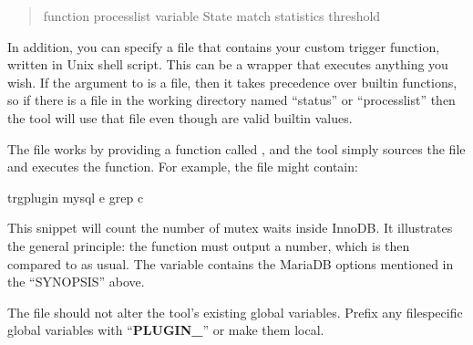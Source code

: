 \documentclass[letterpaper,10pt,english]{sphinxmanual}
\begin{document}
\begin{fulllineitems}
\begin{quote}
\begin{sphinxVerbatim}[commandchars=\\\{\}]
\PYGZhy{}\PYGZhy{}function processlist 
\PYGZhy{}\PYGZhy{}variable State       
\PYGZhy{}\PYGZhy{}match statistics     
\PYGZhy{}\PYGZhy{}threshold 
\end{sphinxVerbatim}
\end{quote}

\sphinxAtStartPar
In addition, you can specify a file that contains your custom trigger
function, written in Unix shell script.  This can be a wrapper that executes
anything you wish.  If the argument to {\hyperref[\detokenize{mariadb-stat:cmdoption-mariadb-stat-function}]{}} is a file, then it
takes precedence over built\sphinxhyphen{}in functions, so if there is a file in the working
directory named “status” or “processlist” then the tool will use that file
even though are valid built\sphinxhyphen{}in values.

\sphinxAtStartPar
The file works by providing a function called , and the tool
simply sources the file and executes the function.  For example, the file
might contain:

\begin{sphinxVerbatim}[commandchars=\\\{\}]
trg\PYGZus{}plugin 
   mysql  \PYGZhy{}e  
      grep \PYGZhy{}c 
\end{sphinxVerbatim}

\sphinxAtStartPar
This snippet will count the number of mutex waits inside InnoDB.  It
illustrates the general principle: the function must output a number, which is
then compared to {\hyperref[\detokenize{mariadb-stat:cmdoption-mariadb-stat-threshold}]{}} as usual.  The  variable
contains the MariaDB options mentioned in the “SYNOPSIS” above.

\sphinxAtStartPar
The file should not alter the tool’s existing global variables.  Prefix any
file\sphinxhyphen{}specific global variables with “{\color{red}\bfseries{}PLUGIN\_}” or make them local.

\end{fulllineitems}
\end{document}
